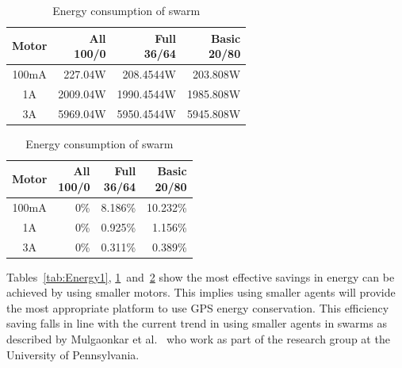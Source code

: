 \begin{table}[H]
\begin{center}
\begin{tabular}{| c | r | r | r |}
\hline
{\parbox{2cm}{\centering Motor}} & {\parbox{2cm}{\centering All\\100/0}} & {\parbox{2cm}{\centering Full\\36/64}} & {\parbox{2cm}{\centering Basic \\20/80}} \\ \hline
100mA &  227.04W &  208.4544W &  203.808W\\ \hline
1A    & 2009.04W & 1990.4544W & 1985.808W\\ \hline
3A    & 5969.04W & 5950.4544W & 5945.808W\\ \hline
\end{tabular}\caption{Energy consumption of swarm} \label{tab:Energy2}
\end{center}
\end{table}

\begin{table}[H]
\begin{center}
\begin{tabular}{| c | r | r | r |}
\hline
{\parbox{2cm}{\centering Motor}} & {\parbox{2cm}{\centering All\\100/0}} & {\parbox{2cm}{\centering Full\\36/64}} & {\parbox{2cm}{\centering Basic \\20/80}} \\ \hline
100mA & 0\% & 8.186\% & 10.232\% \\ \hline
1A    & 0\% & 0.925\% &  1.156\% \\ \hline
3A    & 0\% & 0.311\% &  0.389\% \\ \hline
\end{tabular}\caption{Energy consumption of swarm} \label{tab:Energy3}
\end{center}
\end{table}

Tables~\ref{tab:Energy1}, \ref{tab:Energy2}~and~\ref{tab:Energy3} show the most effective savings in energy can be achieved by using smaller motors. This implies using smaller agents will provide the most appropriate platform to use GPS energy conservation. This efficiency saving falls in line with the current trend in using smaller agents in swarms as described by Mulgaonkar et al.~\cite{KV:16,MCK:15} who work as part of the research group at the University of Pennsylvania.

